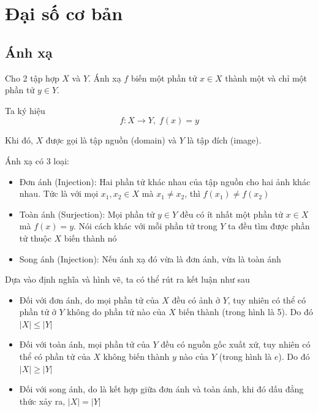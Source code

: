 \chapter{Đại số cơ bản}

\section{Ánh xạ}

Cho 2 tập hợp $X$ và $Y$. Ánh xạ $f$ biến một phần tử $x \in X$ thành một và chỉ một phần tử $y \in Y$.

Ta ký hiệu
\[f: X \to Y, \; f(x) = y\]

Khi đó, $X$ được gọi là tập nguồn (domain) và $Y$ là tập đích (image).

Ánh xạ có 3 loại:

\begin{itemize}[noitemsep]
    \item Đơn ánh (Injection): Hai phần tử khác nhau của tập nguồn cho hai ảnh khác nhau. Tức là với mọi $x_1, x_2 \in X$ mà $x_1 \neq x_2$, thì $f(x_1) \neq f(x_2)$
    \item Toàn ánh (Surjection): Mọi phần tử $y \in Y$ đều có ít nhất một phần tử $x \in X$ mà $f(x) = y$. Nói cách khác với mỗi phần tử trong $Y$ ta đều tìm được phần tử thuộc $X$ biến thành nó
    \item Song ánh (Injection): Nếu ánh xạ đó vừa là đơn ánh, vừa là toàn ánh
\end{itemize}

\begin{remark}
    Dựa vào định nghĩa và hình vẽ, ta có thể rút ra kết luận như sau
    \begin{itemize}[noitemsep]
        \item Đối với đơn ánh, do mọi phần tử của $X$ đều có ảnh ở $Y$, tuy nhiên có thể có phần tử ở $Y$ không do phần tử nào của $X$ biến thành (trong hình là 5). Do đó $| X | \leq | Y |$
        \item Đối với toàn ánh, mọi phần tử của $Y$ đều có nguồn gốc xuất xứ, tuy nhiên có thể có phần tử của $X$ không biến thành $y$ nào của $Y$ (trong hình là $e$). Do đó $| X | \geq | Y |$
        \item Đối với song ánh, do là kết hợp giữa đơn ánh và toàn ánh, khi đó dấu đẳng thức xảy ra, $| X | = | Y |$
    \end{itemize}
\end{remark}

